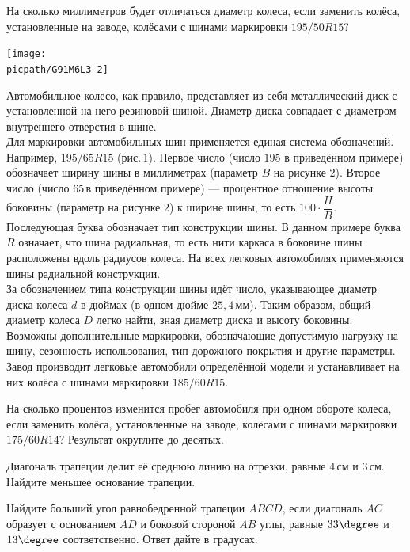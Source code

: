 \begin{homework}[number=2]
	\begin{listofex}
		\item На сколько миллиметров будет отличаться диаметр колеса, если заменить колёса, установленные на заводе, колёсами с шинами маркировки \( 195/50 R15 \)?
		\begin{center}
			\texttt{[image: \\picpath/G91M6L3-2]}
		\end{center}
		Автомобильное колесо, как правило, представляет из себя металлический диск с установленной на него резиновой шиной. Диаметр диска совпадает с диаметром внутреннего отверстия в шине.\\
		Для маркировки автомобильных шин применяется единая система обозначений. Например, \( 195/65 R15 \) (рис. \( 1 \)). Первое число (число \( 195 \) в приведённом примере) обозначает ширину шины в миллиметрах (параметр \( B \) на рисунке \( 2 \)). Второе число (число \( 65 \) в приведённом примере)  — процентное отношение высоты боковины (параметр на рисунке \( 2 \)) к ширине шины, то есть \( 100\cdot\dfrac{H}{B} \). \\
		Последующая буква обозначает тип конструкции шины. В данном примере буква \( R \) означает, что шина радиальная, то есть нити каркаса в боковине шины расположены вдоль радиусов колеса. На всех легковых автомобилях применяются шины радиальной конструкции.\\		
		За обозначением типа конструкции шины идёт число, указывающее диаметр диска колеса \( d \) в дюймах (в одном дюйме \( 25,4 \) мм). Таким образом, общий диаметр колеса \( D \) легко найти, зная диаметр диска и высоту боковины.\\		
		Возможны дополнительные маркировки, обозначающие допустимую нагрузку на шину, сезонность использования, тип дорожного покрытия и другие параметры.		
		Завод производит легковые автомобили определённой модели и устанавливает на них колёса с шинами маркировки \( 185/60 R15 \).
		\item На сколько процентов изменится пробег автомобиля при одном обороте колеса, если заменить колёса, установленные на заводе, колёсами с шинами маркировки \( 175/60 R14 \)? Результат округлите до десятых.		
		\item Диагональ трапеции делит её среднюю линию на отрезки, равные \( 4 \) см и \( 3 \) см. Найдите меньшее основание трапеции.
		\item Найдите больший угол равнобедренной трапеции \( ABCD \), если диагональ \( AC \) образует с основанием \( AD \) и боковой стороной \( AB \) углы, равные \( 33\degree \) и \( 13\degree  \) соответственно. Ответ дайте в градусах.

\end{listofex}
\end{homework}
